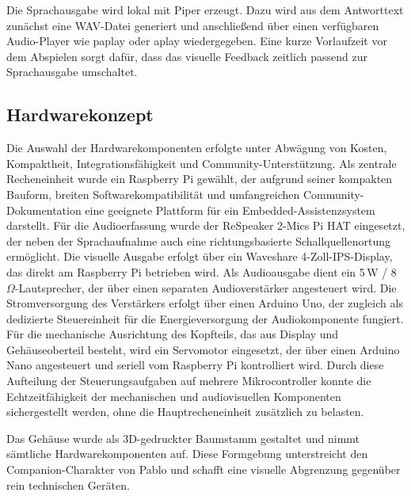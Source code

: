 Die Sprachausgabe wird lokal mit Piper erzeugt. 
Dazu wird aus dem Antworttext zunächst eine WAV-Datei generiert und anschließend über einen verfügbaren Audio-Player wie paplay oder aplay wiedergegeben. 
Eine kurze Vorlaufzeit vor dem Abspielen sorgt dafür, dass das visuelle Feedback zeitlich passend zur Sprachausgabe umschaltet.


\subsection{Hardwarekonzept}
Die Auswahl der Hardwarekomponenten erfolgte unter Abwägung von Kosten, Kompaktheit, Integrationsfähigkeit und Community-Unterstützung.
Als zentrale Recheneinheit wurde ein Raspberry Pi gewählt, der aufgrund seiner kompakten Bauform, breiten Softwarekompatibilität und umfangreichen Community-Dokumentation eine geeignete Plattform für ein Embedded-Assistenzsystem darstellt.
Für die Audioerfassung wurde der ReSpeaker 2-Mics Pi HAT eingesetzt, der neben der Sprachaufnahme auch eine richtungsbasierte Schallquellenortung ermöglicht.
Die visuelle Ausgabe erfolgt über ein Waveshare 4-Zoll-IPS-Display, das direkt am Raspberry Pi betrieben wird.
Als Audioausgabe dient ein 5\,W / 8\,$\Omega$-Lautsprecher, der über einen separaten Audioverstärker angesteuert wird.
Die Stromversorgung des Verstärkers erfolgt über einen Arduino Uno, der zugleich als dedizierte Steuereinheit für die Energieversorgung der Audiokomponente fungiert.
Für die mechanische Ausrichtung des Kopfteils, das aus Display und Gehäuseoberteil besteht, wird ein Servomotor eingesetzt, der über einen Arduino Nano angesteuert und seriell vom Raspberry Pi kontrolliert wird.
Durch diese Aufteilung der Steuerungsaufgaben auf mehrere Mikrocontroller konnte die Echtzeitfähigkeit der mechanischen und audiovisuellen Komponenten sichergestellt werden, ohne die Hauptrecheneinheit zusätzlich zu belasten.

Das Gehäuse wurde als 3D-gedruckter Baumstamm gestaltet und nimmt sämtliche Hardwarekomponenten auf.
Diese Formgebung unterstreicht den Companion-Charakter von Pablo und schafft eine visuelle Abgrenzung gegenüber rein technischen Geräten.